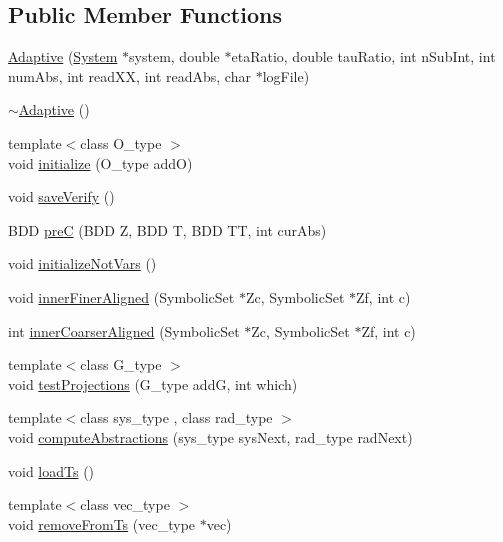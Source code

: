 \subsection*{Public Member Functions}
\begin{DoxyCompactItemize}
\item 
\hyperlink{classscots_1_1Adaptive_a376630f4de5c90857e243c305e3aaa53}{Adaptive} (\hyperlink{classscots_1_1System}{System} $\ast$system, double $\ast$eta\+Ratio, double tau\+Ratio, int n\+Sub\+Int, int num\+Abs, int read\+XX, int read\+Abs, char $\ast$log\+File)
\item 
\hyperlink{classscots_1_1Adaptive_aa20062d309691c2858912bc3fd9616e7}{$\sim$\+Adaptive} ()
\item 
{\footnotesize template$<$class O\+\_\+type $>$ }\\void \hyperlink{classscots_1_1Adaptive_acad37a2f5296206da9c7ab2b82e622fd}{initialize} (O\+\_\+type addO)
\item 
void \hyperlink{classscots_1_1Adaptive_ab1d6eeb4c4b6ec88e7e6a283a7dfd57d}{save\+Verify} ()
\item 
B\+DD \hyperlink{classscots_1_1Adaptive_aa12a6d24ae6d46011215c2008181bbd2}{preC} (B\+DD Z, B\+DD T, B\+DD TT, int cur\+Abs)
\item 
void \hyperlink{classscots_1_1Adaptive_a6a9af6f25e8c4015ceb24d704da26972}{initialize\+Not\+Vars} ()
\item 
void \hyperlink{classscots_1_1Adaptive_af4c5423a62b8c11110d0a2bdcc96d4fb}{inner\+Finer\+Aligned} (Symbolic\+Set $\ast$Zc, Symbolic\+Set $\ast$Zf, int c)
\item 
int \hyperlink{classscots_1_1Adaptive_a01f8f69d290f9c81f76f6ab44d9ef193}{inner\+Coarser\+Aligned} (Symbolic\+Set $\ast$Zc, Symbolic\+Set $\ast$Zf, int c)
\item 
{\footnotesize template$<$class G\+\_\+type $>$ }\\void \hyperlink{classscots_1_1Adaptive_a9a715bff15ed2365485cca7818c71479}{test\+Projections} (G\+\_\+type addG, int which)
\item 
{\footnotesize template$<$class sys\+\_\+type , class rad\+\_\+type $>$ }\\void \hyperlink{classscots_1_1Adaptive_af6aeb2170e7223c1396454ab2b83fb09}{compute\+Abstractions} (sys\+\_\+type sys\+Next, rad\+\_\+type rad\+Next)
\item 
void \hyperlink{classscots_1_1Adaptive_a111bfb2d3fd8eb0a3871da715985d534}{load\+Ts} ()
\item 
{\footnotesize template$<$class vec\+\_\+type $>$ }\\void \hyperlink{classscots_1_1Adaptive_a47e3334958032965fa6218ad0c24ac02}{remove\+From\+Ts} (vec\+\_\+type $\ast$vec)

\end{DoxyCompactItemize}
